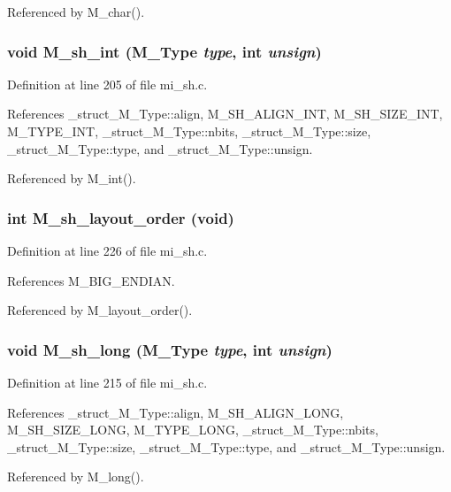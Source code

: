 Referenced by M\_\-char().
\subsubsection{\setlength{\rightskip}{0pt plus 5cm}void M\_\-sh\_\-int (\bf{M\_\-Type} {\em type}, int {\em unsign})}\label{mi__sh_8c_8ff9869c75b2c937e123ceda8e06c33f}




Definition at line 205 of file mi\_\-sh.c.

References \_\-struct\_\-M\_\-Type::align, M\_\-SH\_\-ALIGN\_\-INT, M\_\-SH\_\-SIZE\_\-INT, M\_\-TYPE\_\-INT, \_\-struct\_\-M\_\-Type::nbits, \_\-struct\_\-M\_\-Type::size, \_\-struct\_\-M\_\-Type::type, and \_\-struct\_\-M\_\-Type::unsign.

Referenced by M\_\-int().
\subsubsection{\setlength{\rightskip}{0pt plus 5cm}int M\_\-sh\_\-layout\_\-order (void)}\label{mi__sh_8c_ce450ce307a8ddc762175371fd13e126}




Definition at line 226 of file mi\_\-sh.c.

References M\_\-BIG\_\-ENDIAN.

Referenced by M\_\-layout\_\-order().
\subsubsection{\setlength{\rightskip}{0pt plus 5cm}void M\_\-sh\_\-long (\bf{M\_\-Type} {\em type}, int {\em unsign})}\label{mi__sh_8c_b719980e8ecc9ae306f11206b9fcca4c}




Definition at line 215 of file mi\_\-sh.c.

References \_\-struct\_\-M\_\-Type::align, M\_\-SH\_\-ALIGN\_\-LONG, M\_\-SH\_\-SIZE\_\-LONG, M\_\-TYPE\_\-LONG, \_\-struct\_\-M\_\-Type::nbits, \_\-struct\_\-M\_\-Type::size, \_\-struct\_\-M\_\-Type::type, and \_\-struct\_\-M\_\-Type::unsign.

Referenced by M\_\-long().
